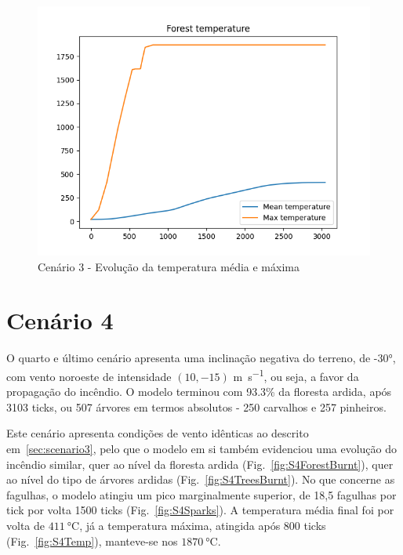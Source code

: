 \begin{figure}[H]
    \centering
    \includegraphics[width=\textwidth]{../src/runs/scenario3/temperature}
    \caption{Cenário 3 - Evolução da temperatura média e máxima}
    \label{fig:S3Temp}
\end{figure}


\section{Cenário 4}\label{sec:scenario4}

O quarto e último cenário apresenta uma inclinação negativa do terreno, de \ang{-30}, com vento noroeste de intensidade $(10, -15)$ \si{\meter\per\second}, ou seja, a favor da propagação do incêndio.
O modelo terminou com 93.3\% da floresta ardida, após 3103 ticks, ou 507 árvores em termos absolutos - 250 carvalhos e 257 pinheiros.

Este cenário apresenta condições de vento idênticas ao descrito em~\ref{sec:scenario3}, pelo que o modelo em si também evidenciou uma evolução do incêndio similar, quer ao nível da floresta ardida (Fig.~\ref{fig:S4ForestBurnt}), quer ao nível do tipo de árvores ardidas (Fig.~\ref{fig:S4TreesBurnt}).
No que concerne as fagulhas, o modelo atingiu um pico marginalmente superior, de 18,5 fagulhas por tick por volta 1500 ticks (Fig.~\ref{fig:S4Sparks}).
A temperatura média final foi por volta de $\SI{411}{\degreeCelsius}$, já a temperatura máxima, atingida após 800 ticks (Fig.~\ref{fig:S4Temp}), manteve-se nos $\SI{1870}{\degreeCelsius}$.

